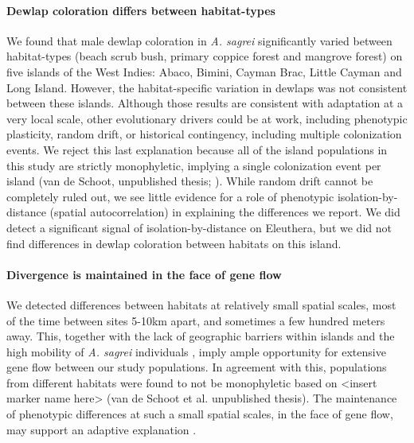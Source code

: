 

\paragraph{Dewlap coloration differs between habitat-types} We found that male dewlap coloration in \textit{A. sagrei} significantly varied between habitat-types (beach scrub bush, primary coppice forest and mangrove forest) on five islands of the West Indies: Abaco, Bimini, Cayman Brac, Little Cayman and Long Island. However, the habitat-specific variation in dewlaps was not consistent between these islands. Although those results are consistent with adaptation at a very local scale, other evolutionary drivers could be at work, including phenotypic plasticity, random drift, or historical contingency, including multiple colonization events. We reject this last explanation because all of the island populations in this study are strictly monophyletic, implying a single colonization event per island (van de Schoot, unpublished thesis; \citealt{Driessens2017}). While random drift cannot be completely ruled out, we see little evidence for a role of phenotypic isolation-by-distance (spatial autocorrelation) in explaining the differences we report. We did detect a significant signal of isolation-by-distance on Eleuthera, but we did not find differences in dewlap coloration between habitats on this island.


\paragraph{Divergence is maintained in the face of gene flow} We detected differences between habitats at relatively small spatial scales, most of the time between sites 5-10km apart, and sometimes a few hundred meters away. This, together with the lack of geographic barriers within islands and the high mobility of \textit{A. sagrei} individuals \citep{Kamath2018}, imply ample opportunity for extensive gene flow between our study populations. In agreement with this, populations from different habitats were found to not be monophyletic based on <insert marker name here> (van de Schoot et al. unpublished thesis). The maintenance of phenotypic differences at such a small spatial scales, in the face of gene flow, may support an adaptive explanation \citep{Richardson2014}.\\

